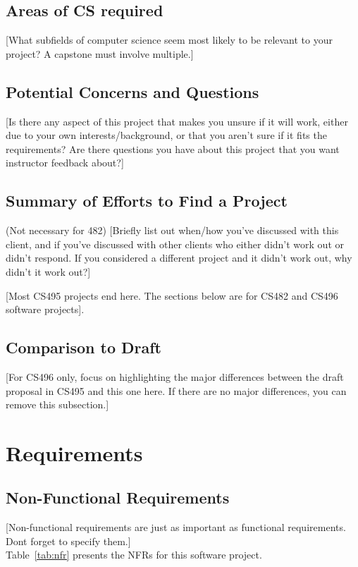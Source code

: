 \documentclass{article}
\begin{document}
\subsection{Areas of CS required}
[What subfields of computer science seem most likely to be relevant to your project? A capstone must involve multiple.]

\subsection{Potential Concerns and Questions}
[Is there any aspect of this project that makes you unsure if it will work, either due to your own interests/background, or that you aren't sure if it fits the requirements? Are there questions you have about this project that you want instructor feedback about?]

\subsection{Summary of Efforts to Find a Project}
(Not necessary for 482) [Briefly list out when/how you've discussed with this client, and if you've discussed with other clients who either didn't work out or didn't respond. If you considered a different project and it didn't work out, why didn't it work out?] 

[Most CS495 projects end here. The sections below are for CS482 and CS496 software projects].

\subsection{Comparison to Draft}
[For CS496 only, focus on highlighting the major differences between the draft proposal in CS495 and this one here. If there are no major differences, you can remove this subsection.]

\section{Requirements}

\subsection{Non-Functional Requirements}
[Non-functional requirements are just as important as functional requirements. Dont forget to specify them.]\\

Table~\ref{tab:nfr} presents the NFRs for this software project.
\end{document}
